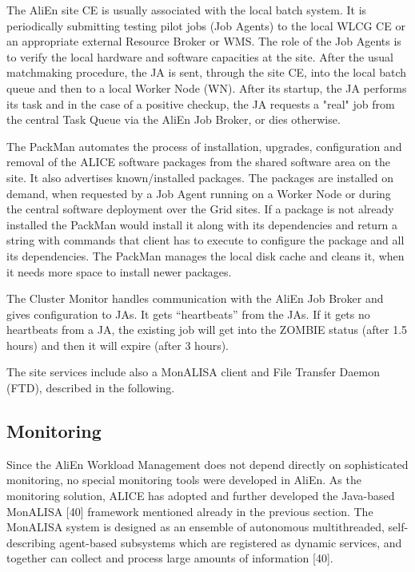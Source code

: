 \documentclass{intech}
\begin{document}
The AliEn site CE is usually associated with the local batch system.
It is periodically submitting testing pilot jobs (Job Agents)  to
the local WLCG CE or an appropriate external Resource Broker or WMS.
The role of the Job Agents is to verify the local hardware and
software capacities at the site. After the usual matchmaking
procedure, the JA is sent, through the site CE, into the local batch
queue and then to a local Worker Node (WN). After its startup, the
JA performs its task and in the case of a positive checkup, the JA
requests a "real" job from the central Task Queue via the AliEn Job
Broker, or dies otherwise.

The PackMan automates the process of installation, upgrades,
configuration and removal of the ALICE software packages from the
shared software area on the site. It also advertises known/installed
packages. The packages are installed on demand, when requested by a
Job Agent running on a Worker Node or during the central software
deployment over the Grid sites. If a package is not already
installed the PackMan would install it along with its dependencies
and return a string with commands that client has to execute to
configure the package and all its dependencies. The PackMan manages
the local disk cache and cleans it, when it needs more space to
install newer packages.

The Cluster Monitor handles communication with the AliEn Job Broker
and gives configuration to JAs.  It gets ``heartbeats'' from the JAs.
If it gets no heartbeats from a JA, the existing job will get into
the ZOMBIE status (after 1.5 hours) and then it will expire (after 3 hours).

The site services include also a MonALISA client and File Transfer
Daemon (FTD), described in the following.

\subsection{Monitoring}
%
Since the AliEn Workload Management does not
depend directly on sophisticated monitoring, no special monitoring
tools were developed in AliEn. As the monitoring solution, ALICE has
adopted and further developed the Java-based MonALISA [40] framework
mentioned already in the previous section. The MonALISA system is
designed as an ensemble of autonomous multithreaded, self-describing
agent-based subsystems which are registered as dynamic services, and
together can collect and process large amounts of information [40].
\end{document}
